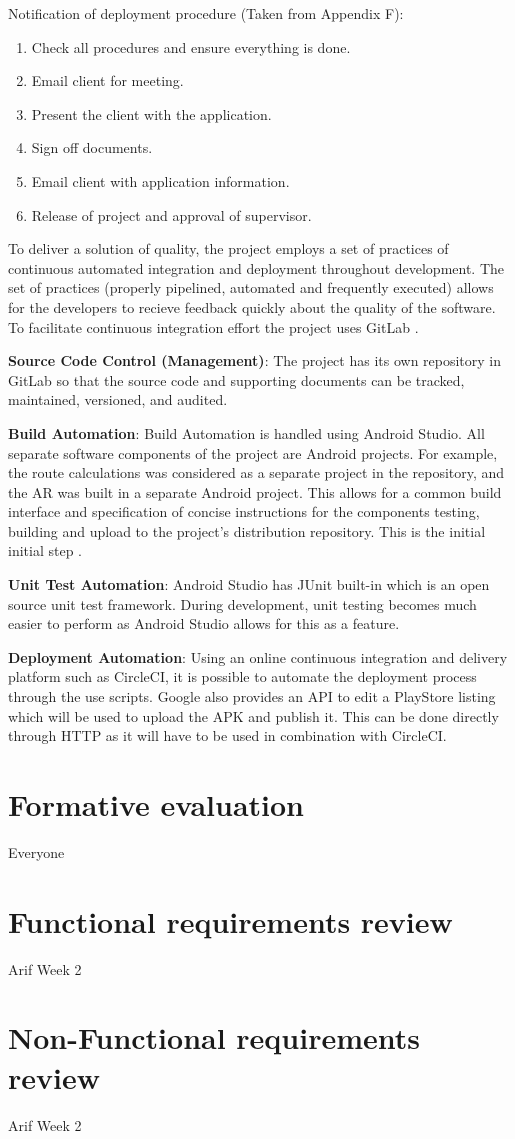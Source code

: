 Notification of deployment procedure (Taken from Appendix F):

\begin{enumerate}
	\item Check all procedures and ensure everything is done.
	\item Email client for meeting.
	\item Present the client with the application.
	\item Sign off documents.
	\item Email client with application information.
	\item Release of project and approval of supervisor.
\end{enumerate}

To deliver a solution of quality, the project employs a set of practices of continuous automated integration and deployment throughout development. The set of practices (properly pipelined, automated and frequently executed) allows for the developers to recieve feedback quickly about the quality of the software. To facilitate continuous integration effort the project uses GitLab .

\textbf{Source Code Control (Management)}: The project has its own repository in GitLab so that the source code and supporting documents can be tracked, maintained, versioned, and audited.

\textbf{Build Automation}: Build Automation is handled using Android Studio. All separate software components of the project are Android projects. For example, the route calculations was considered as a separate project in the repository, and the AR was built in a separate Android project. This allows for a common build interface and specification of concise instructions for the components testing, building and upload to the project's distribution repository. This is the initial initial step .

\textbf{Unit Test Automation}: Android Studio has JUnit built-in which is an open source unit test framework. During development, unit testing becomes much easier to perform as Android Studio allows for this as a feature.

\textbf{Deployment Automation}: Using an online continuous integration and delivery platform such as CircleCI, it is possible to automate the deployment process through the use scripts. Google also provides an API to edit a PlayStore listing which will be used to upload the APK and publish it. This can be done directly through HTTP as it will have to be used in combination with CircleCI.

\section{Formative evaluation}
Everyone

\section{Functional requirements review}
Arif Week 2

\section{Non-Functional requirements review}
Arif Week 2